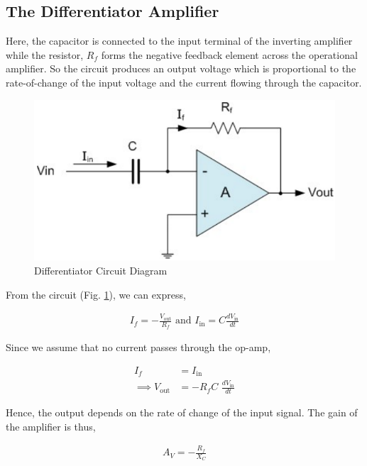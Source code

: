 
\subsection{The Differentiator Amplifier}

Here, the capacitor is connected to the input terminal of the inverting amplifier while the resistor, $R_f$ forms the negative feedback element across the operational amplifier. So the circuit produces an output voltage which is proportional to the rate-of-change of the input voltage and the current flowing through the capacitor.

\begin{figure}[H]
    \centering
    \includegraphics[width=0.7\columnwidth]{images/differentiator.png}
    \caption{Differentiator Circuit Diagram}
    \label{diff0}
\end{figure}

From the circuit (Fig. \ref{diff0}), we can express,

\begin{align}
    I_f=-\frac{V_\text{out}}{R_f}\text{ and }I_\text{in}=C\frac{dV_\text{in}}{dt}
\end{align}

Since we assume that no current passes through the op-amp,

\begin{align}
    I_f&=I_\text{in} \nonumber \\
    \implies V_\text{out} &= -R_f C\,\,\frac{dV_\text{in}}{dt}        
\end{align}

Hence, the output depends on the rate of change of the input signal. The gain of the amplifier is thus,

\begin{align}
    A_V=-\frac{R_f}{X_C} \label{differentiator_gain}
\end{align}

